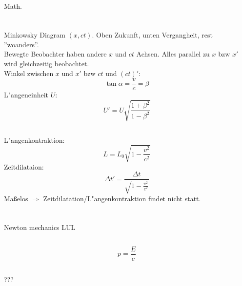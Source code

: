 \documentclass[12pt]{report}
\begin{document}
\subsection{}

Math.

\section{}

\subsection{}

\subsection{}

Minkowsky Diagram $(x,ct)$. Oben Zukunft, unten Vergangheit, rest ''woanders''.\\
Bewegte Beobachter haben andere $x$ und $ct$ Achsen. Alles parallel zu $x$ bzw $x'$ wird gleichzeitig beobachtet.\\
Winkel zwischen $x$ und $x'$ bzw $ct$ und $(ct)'$: \[\tan\alpha=\frac{v}{c}=\beta\]
L"angeneinheit $U$: \[U'=U\sqrt{\frac{1+\beta^2}{1-\beta^2}}\]

\subsection{}

L"angenkontraktion:
\[L=L_0\sqrt{1-\frac{v^2}{c^2}}\]
Zeitdilataion:
\[\Delta t'=\frac{\Delta t}{\sqrt{1-\frac{v^2}{c^2}}}\]
Ma\ss elos $\Rightarrow$ Zeitdilatation/L"angenkontraktion findet nicht statt.

\section{}

\subsection{}
Newton mechanics LUL

\subsection{}
\[p=\frac{E}{c}\]

\subsection{}
???
\end{document}
